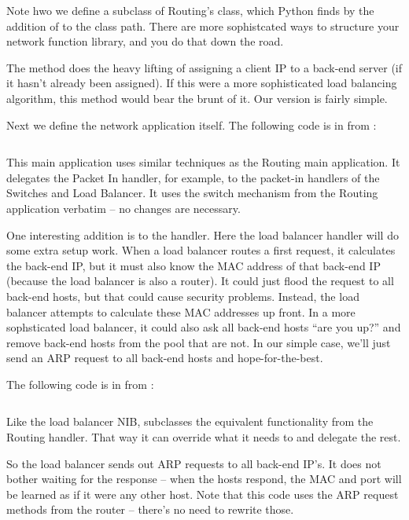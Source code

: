 \inputminted{python}{code/routing_variants/load_balancer_nib.py}

Note hwo we define a subclass of Routing's  class, which
Python finds by the addition of  to the class path.  There are more sophistcated
ways to structure your network function library, and you do that down the road.  

The method  does the heavy lifting of assigning a client IP to a back-end
server (if it hasn't already been assigned).  If this were a more sophisticated load balancing
algorithm, this method would bear the brunt of it.  Our version is fairly simple.

Next we define the network application itself.  The following code is in from 
:

\inputminted{python}{code/routing_variants/load_balancer1.py}

This main application uses similar techniques as the Routing main application.  It delegates
the Packet In handler, for example, to the packet-in handlers of the Switches and Load Balancer.
It uses the switch mechanism from the Routing application verbatim -- no changes are
necessary.  

One interesting addition is to the  handler.  Here the load balancer
handler will do some extra setup work.  When a load balancer routes a first request, it 
calculates the back-end IP, but it must also know the MAC address of that back-end IP 
(because the load balancer is also a router).  It could just flood the request to all
back-end hosts, but that could cause security problems.  Instead, the load balancer attempts
to calculate these MAC addresses up front.  In a more sophsticated load balancer, it could
also ask all back-end hosts ``are you up?'' and remove back-end hosts from the pool that are not.
In our simple case, we'll just send an ARP request to all back-end hosts and hope-for-the-best.

The following code is in from 
:

\inputminted[lastline=17]{python}{code/routing_variants/load_balancer_handler.py} 

Like the load balancer NIB,  subclasses the equivalent functionality
from the Routing handler.  That way it can override what it needs to and delegate the rest.

So the load balancer sends out ARP requests to all back-end IP's.  It does not bother 
waiting for the response -- when the hosts respond, the MAC and port will be learned as if it
were any other host.  Note that this code uses the ARP request methods from the router -- there's
no need to rewrite those.


